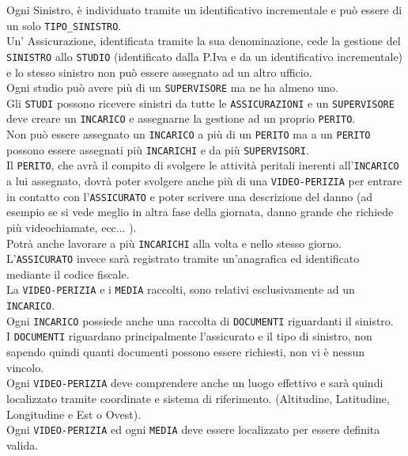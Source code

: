 \documentclass[a4paper,12pt]{report}
\begin{document}
Ogni Sinistro, è individuato tramite un identificativo incrementale e può essere di un solo \texttt{TIPO\_SINISTRO}.
\\
Un’ Assicurazione, identificata tramite la sua denominazione, cede la gestione del \texttt{SINISTRO} allo \texttt{STUDIO} (identificato dalla P.Iva e da un identificativo incrementale) e lo stesso sinistro non può essere assegnato ad un altro ufficio.
\\
Ogni studio può avere più di un \texttt{SUPERVISORE} ma ne ha almeno uno.
\\
Gli \texttt{STUDI} possono ricevere sinistri da tutte le \texttt{ASSICURAZIONI} e un \texttt{SUPERVISORE} deve  creare un \texttt{INCARICO} e assegnarne la gestione ad un proprio \texttt{PERITO}.
\\
Non può essere assegnato un \texttt{INCARICO} a più di un \texttt{PERITO} ma a un \texttt{PERITO} possono essere assegnati più \texttt{INCARICHI} e da più \texttt{SUPERVISORI}.
\\
Il \texttt{PERITO}, che avrà il compito di svolgere le attività peritali inerenti all’\texttt{INCARICO} a lui assegnato, dovrà poter svolgere anche più di una \texttt{VIDEO-PERIZIA} per entrare in contatto con l’\texttt{ASSICURATO} e poter scrivere una descrizione del danno (ad esempio se si vede meglio in altra fase della giornata, danno grande che richiede più videochiamate, ecc...  ).
\\
Potrà anche lavorare a più \texttt{INCARICHI} alla volta e nello stesso giorno.
\\
L’\texttt{ASSICURATO} invece sarà registrato tramite un’anagrafica ed identificato mediante il codice fiscale.
\\
La \texttt{VIDEO-PERIZIA} e i \texttt{MEDIA} raccolti, sono relativi esclusivamente ad un \texttt{INCARICO}. 
\\
Ogni \texttt{INCARICO} possiede anche una raccolta di \texttt{DOCUMENTI} riguardanti il sinistro.
\\
I \texttt{DOCUMENTI} riguardano principalmente l’assicurato e il tipo di sinistro, non sapendo quindi quanti documenti possono essere richiesti, non vi è nessun vincolo. 
\\
Ogni \texttt{VIDEO-PERIZIA} deve comprendere anche un luogo effettivo e sarà quindi localizzato tramite coordinate e sistema di riferimento. (Altitudine, Latitudine, Longitudine e Est o Ovest).
\\
Ogni \texttt{VIDEO-PERIZIA} ed ogni \texttt{MEDIA} deve essere localizzato per essere definita valida.
\\
\end{document}
